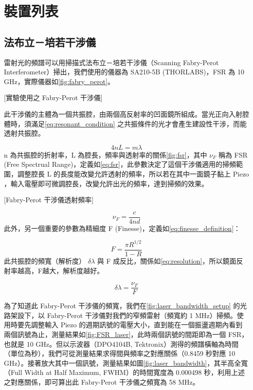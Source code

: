 \documentclass[class=NCU_thesis, crop=false]{standalone}
\begin{document}
\chapter{裝置列表}


\section{法布立－培若干涉儀}
雷射光的頻譜可以用掃描式法布立－培若干涉儀（Scanning Fabry-Perot Interferometer）掃出，我們使用的儀器為 SA210-5B (THORLABS)，FSR 為 10 GHz，實際儀器如\cref{fig:fabry_perot}。

[實驗使用之 Fabry-Perot 干涉儀]

此干涉儀的主體為一個共振腔，由兩個高反射率的凹面鏡所組成。當光正向入射腔體時，須滿足\cref{eq:resonant_condition} 之共振條件的光才會產生建設性干涉，而能透射共振腔。

\begin{equation}
    4nL=m\lambda
    \label{eq:resonant_condition}
\end{equation}
n 為共振腔的折射率，L 為腔長，頻率與透射率的關係\cref{fig:fsr}，其中 $\nu_{F}$ 稱為 FSR (Free Spectrual Range)，定義如\cref{eq:fsr}，此參數決定了這個干涉儀適用的掃頻範圍，調整腔長 L 的長度能改變允許透射的頻率，所以若在其中一面鏡子黏上 Piezo ，輸入電壓即可微調腔長，改變允許出光的頻率，達到掃頻的效果。

[Fabry-Perot 干涉儀透射頻率]

\begin{equation}
    \nu_{F}=\frac{c}{4nd}
    \label{eq:fsr}
\end{equation}
此外，另一個重要的參數為精細度 F (Finesse)，定義如\cref{eq:finesse_definition}：

\begin{equation}
    F=\frac{\pi R^{1/2}}{1-R}
    \label{eq:finesse_definition}
\end{equation}
此共振腔的頻寬（解析度） $\delta \lambda$ 與 F 成反比，關係如\cref{eq:resolution}，所以鏡面反射率越高，F越大，解析度越好。

\begin{equation}
    \delta \lambda=\frac{\nu_{F}}{F}
    \label{eq:resolution}
\end{equation}

為了知道此 Fabry-Perot 干涉儀的頻寬，我們在\cref{fig:laser_bandwidth_setup} 的光路架設下，以 Fabry-Perot 干涉儀對我們的窄頻雷射（頻寬約 1 MHz）掃頻。使用時要先調整輸入 Piezo 的週期訊號的電壓大小，直到能在一個振盪週期內看到兩個訊號為止，測量結果如\cref{fig:FSR_laser}，此時兩個訊號的間距即為一個 FSR，也就是 10 GHz。但以示波器（DPO4104B, Tektronix）測得的頻譜橫軸為時間（單位為秒），我們可從測量結果求得間與頻率之對應關係（0.8459 秒對應 10 GHz）。接著放大其中一個訊號，測量結果如圖\cref{fig:laser_bandwidth}，其半高全寬（Full Width at Half Maximum, FWHM）的時間寬度為 0.000498 秒，利用上述之對應關係，即可算出此 Fabry-Perot 干涉儀之頻寬為 58 MHz。
\end{document}
